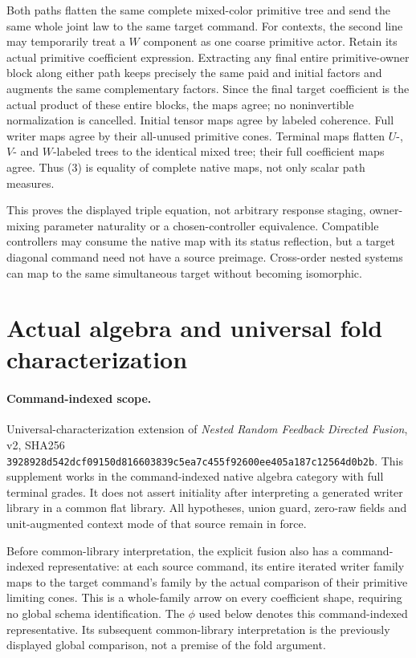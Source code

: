 \documentclass[11pt]{article}\usepackage{amsmath,amssymb,amsthm,geometry}\geometry{margin=1in}\newtheorem{lemma}{Lemma}\newtheorem{theorem}[lemma]{Theorem}
\begin{document}
Both paths flatten the same complete mixed-color primitive tree and send the same whole joint law to the same target command. For contexts, the second line may temporarily treat a $W$ component as one coarse primitive actor. Retain its actual primitive coefficient expression. Extracting any final entire primitive-owner block along either path keeps precisely the same paid and initial factors and augments the same complementary factors. Since the final target coefficient is the actual product of these entire blocks, the maps agree; no noninvertible normalization is cancelled. Initial tensor maps agree by labeled coherence. Full writer maps agree by their all-unused primitive cones. Terminal maps flatten $U$-, $V$- and $W$-labeled trees to the identical mixed tree; their full coefficient maps agree. Thus (3) is equality of complete native maps, not only scalar path measures.

This proves the displayed triple equation, not arbitrary response staging, owner-mixing parameter naturality or a chosen-controller equivalence. Compatible controllers may consume the native map with its status reflection, but a target diagonal command need not have a source preimage. Cross-order nested systems can map to the same simultaneous target without becoming isomorphic.

\section{Actual algebra and universal fold characterization}
\paragraph{Command-indexed scope.} Universal-characterization extension of \emph{Nested Random Feedback Directed Fusion}, v2, SHA256 \texttt{3928928d542dcf09150d816603839c5ea7c455f92600ee405a187c12564d0b2b}. This supplement works in the command-indexed native algebra category with full terminal grades. It does not assert initiality after interpreting a generated writer library in a common flat library. All hypotheses, union guard, zero-raw fields and unit-augmented context mode of that source remain in force.

Before common-library interpretation, the explicit fusion also has a command-indexed representative: at each source command, its entire iterated writer family maps to the target command's family by the actual comparison of their primitive limiting cones. This is a whole-family arrow on every coefficient shape, requiring no global schema identification. The $\phi$ used below denotes this command-indexed representative. Its subsequent common-library interpretation is the previously displayed global comparison, not a premise of the fold argument.
\end{document}
